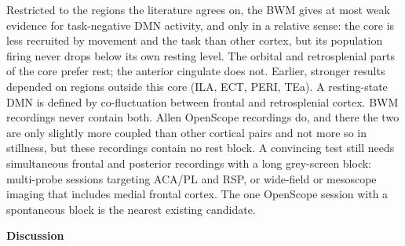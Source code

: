 \documentclass[10pt,a4paper]{article}
\begin{document}
Restricted to the regions the literature agrees on, the BWM gives at most weak evidence for task-negative DMN activity, and only in a relative sense: the core is less recruited by movement and the task than other cortex, but its population firing never drops below its own resting level. The orbital and retrosplenial parts of the core prefer rest; the anterior cingulate does not. Earlier, stronger results depended on regions outside this core (ILA, ECT, PERI, TEa). A resting-state DMN is defined by co-fluctuation between frontal and retrosplenial cortex. BWM recordings never contain both. Allen OpenScope recordings do, and there the two are only slightly more coupled than other cortical pairs and not more so in stillness, but these recordings contain no rest block. A convincing test still needs simultaneous frontal and posterior recordings with a long grey-screen block: multi-probe sessions targeting ACA/PL and RSP, or wide-field or mesoscope imaging that includes medial frontal cortex. The one OpenScope session with a spontaneous block is the nearest existing candidate.

\clearpage
{\LARGE\bfseries Discussion}\par\smallskip{\color{accent}\rule{\linewidth}{0.8pt}}\par\medskip
\end{document}
